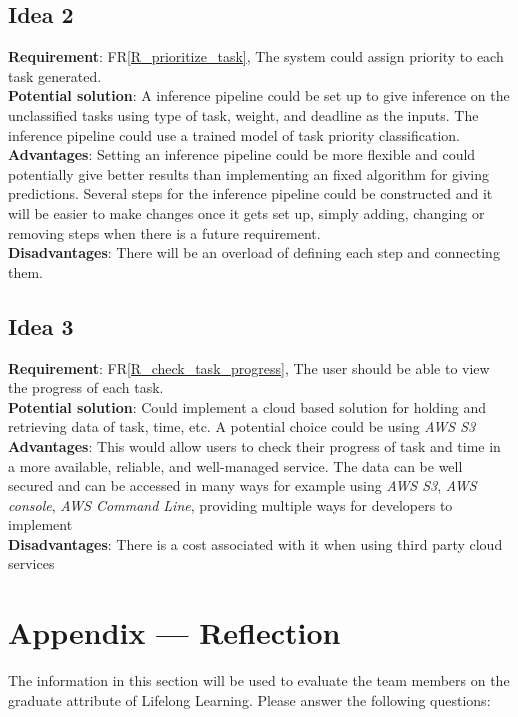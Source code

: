 \documentclass[12pt]{article}
\newcommand{\frref}[1]{FR\ref{#1}}
\begin{document}
\subsection{Idea 2}
\textbf{Requirement}: \frref{R_prioritize_task}, The system could assign priority to each task generated. \\
\textbf{Potential solution}: A inference pipeline could be set up to give inference on the unclassified tasks using type of task, weight, and deadline as the inputs. The inference pipeline could use a trained model of task priority classification.\\
\textbf{Advantages}: Setting an inference pipeline could be more flexible and could potentially give better results than implementing an fixed algorithm for giving predictions. Several steps for the inference pipeline could be constructed and it will be easier to make changes once it gets set up, simply adding, changing or removing steps when there is a future requirement.\\
\textbf{Disadvantages}: There will be an overload of defining each step and connecting them. \\

\subsection{Idea 3}
\textbf{Requirement}: \frref{R_check_task_progress}, The user should be able to view the progress of each task. \\
\textbf{Potential solution}: Could implement a cloud based solution for holding and retrieving data of task, time, etc. A potential choice could be using \textit{AWS S3}\\
\textbf{Advantages}: This would allow users to check their progress of task and time in a more available, reliable, and well-managed service. The data can be well secured and can be accessed in many ways for example using \textit{AWS S3}, \textit{AWS console}, \textit{AWS Command Line}, providing multiple ways for developers to implement  \\
\textbf{Disadvantages}: There is a cost associated with it when using third party cloud services
\newpage{}
\section*{Appendix --- Reflection}

The information in this section will be used to evaluate the team members on the
graduate attribute of Lifelong Learning.  Please answer the following questions:
\end{document}
